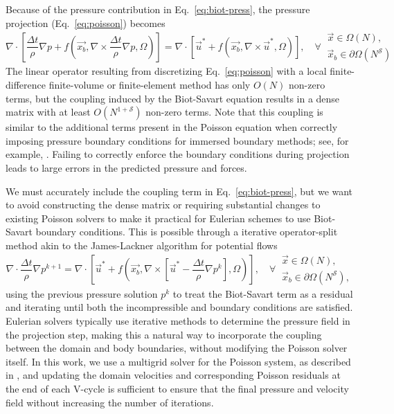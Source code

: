 \documentclass[final,1p,times]{elsarticle}
\begin{document}
Because of the pressure contribution in Eq.~\ref{eq:biot-press}, the pressure projection (Eq.~\ref{eq:poisson}) becomes
\begin{equation}\label{eq:complex_poisson}
    \nabla\cdot\left[\frac{\Delta t}{\rho}\nabla p + f\left(\vec{x_b},\nabla\times\frac{\Delta t}{\rho}\nabla p,\Omega\right)\right] = \nabla\cdot\left[ \vec{u}^* + f(\vec{x_b},\nabla\times\vec{u}^*,\Omega)\right], \quad\forall\
    \begin{array}{l}
    \vec{x} \in \Omega(N),\\
    \vec{x}_b \in \partial\Omega(N^\mathcal{S})
    \end{array}
\end{equation}
The linear operator resulting from discretizing Eq.~\ref{eq:poisson} with a local finite-difference finite-volume or finite-element method has only $O(N)$ non-zero terms, but the coupling induced by the Biot-Savart equation results in a dense matrix with at least $O(N^{1+\mathcal{S}})$ non-zero terms. Note that this coupling is similar to the additional terms present in the Poisson equation when correctly imposing pressure boundary conditions for immersed boundary methods; see, for example, \cite{Taira2007, Lauber2022}. Failing to correctly enforce the boundary conditions during projection leads to large errors in the predicted pressure and forces.

We must accurately include the coupling term in Eq.~\ref{eq:biot-press}, but we want to avoid constructing the dense matrix or requiring substantial changes to existing Poisson solvers to make it practical for Eulerian schemes to use Biot-Savart boundary conditions. This is possible through a iterative operator-split method akin to the James-Lackner algorithm for potential flows
\begin{equation}\label{eq:differed_poisson}
    \nabla\cdot\frac{\Delta t}{\rho}\nabla p^{k+1} = \nabla\cdot\left[ \vec{u}^* + f\left(\vec{x_b},\nabla\times\left[\vec{u}^*-\frac{\Delta t}{\rho}\nabla p^k\right],\Omega\right)\right], \quad\forall\
    \begin{array}{l}
    \vec{x} \in \Omega(N),\\
    \vec{x}_b \in \partial\Omega(N^\mathcal{S}),
    \end{array}
\end{equation}
using the previous pressure solution $p^k$ to treat the Biot-Savart term as a residual and iterating until both the incompressible and boundary conditions are satisfied. Eulerian solvers typically use iterative methods to determine the pressure field in the projection step, making this a natural way to incorporate the coupling between the domain and body boundaries, without modifying the Poisson solver itself. In this work, we use a multigrid solver for the Poisson system, as described in \cite{Weymouth2022Data-drivenProjection}, and updating the domain velocities and corresponding Poisson residuals at the end of each V-cycle is sufficient to ensure that the final pressure and velocity field without increasing the number of iterations.
\end{document}
